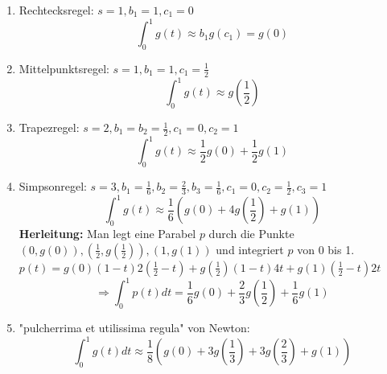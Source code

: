 \begin{example}
\begin{description}
  \item 
\end{description}
\begin{enumerate}
  \item Rechtecksregel: $s = 1, b_1 = 1, c_1 = 0$
    $$ \int_0^1 g(t) \approx b_1 g(c_1) = g(0)$$
  \item Mittelpunktsregel: $s = 1, b_1 = 1, c_1 = \frac{1}{2}$
    $$ \int_0^1 g(t) \approx g(\frac{1}{2})$$
  \item Trapezregel: $s=2, b_1=b_2= \frac{1}{2}, c_1 = 0, c_2 = 1$
    $$ \int_0^1 g(t) \approx \frac{1}{2} g(0) + \frac{1}{2}g(1)$$
  \item Simpsonregel: $s=3, b_1 =  \frac{1}{6}, b_2 =  \frac{2}{3}, b_3 =  \frac{1}{6}, c_1 = 0, c_2 =  \frac{1}{2}, c_3 = 1$
    $$ \int_0^1 g(t) \approx \frac{1}{6} \left(g(0) + 4g\left(\frac{1}{2}\right) +g(1)\right)$$ 
    \textbf{Herleitung:} Man legt eine Parabel $p$ durch die Punkte $(0, g(0)), (\frac{1}{2}, g(\frac{1}{2})), (1, g(1))$ und integriert $p$ von 0 bis 1. \\
    $p(t) = g(0)(1-t)2(\frac{1}{2}-t) + g(\frac{1}{2})(1-t)4t + g(1)(\frac{1}{2}-t)2t$ \\
    $$\Rightarrow \int_0^1 p(t)dt = \frac{1}{6}g(0)+ \frac{2}{3}g(\frac{1}{2}) +\frac{1}{6}g(1)$$ 
  \item "pulcherrima et utilissima regula" von Newton:
    $$\int_0^1 g(t) dt \approx \frac{1}{8}\left(g(0) + 3g(\frac{1}{3}) + 3g(\frac{2}{3}) + g(1)\right)$$
\end{enumerate}

\end{example}

